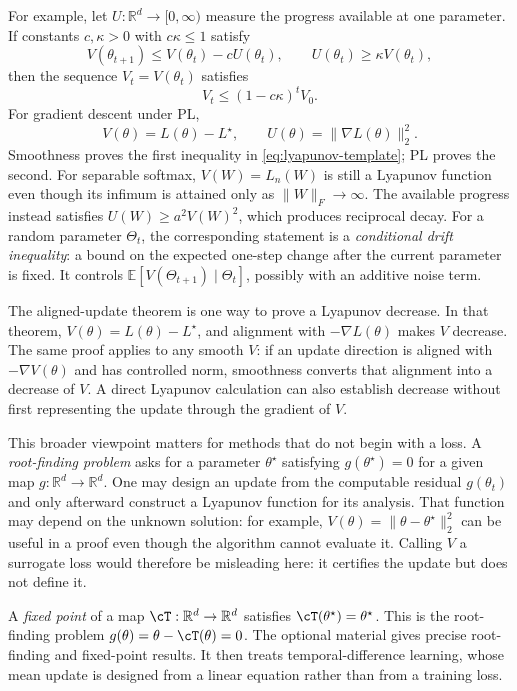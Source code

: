 \documentclass[11pt,twoside]{article}
\newcommand{\E}{\mathbb E}
\newcommand{\R}{\mathbb R}
\theoremstyle{definition}
\theoremstyle{remark}
\begin{document}
For example, let $U:\R^d\to[0,\infty)$ measure the progress available at one
parameter. If constants $c,\kappa>0$ with $c\kappa\le1$ satisfy
\begin{equation}
 V(\theta_{t+1})\le V(\theta_t)-cU(\theta_t),
 \qquad
 U(\theta_t)\ge\kappa V(\theta_t),
 \label{eq:lyapunov-template}
\end{equation}
then the sequence $V_t=V(\theta_t)$ satisfies
\begin{equation}
 V_t\le(1-c\kappa)^tV_0.
 \label{eq:lyapunov-geometric}
\end{equation}
For gradient descent under PL,
\[
 V(\theta)=L(\theta)-L^\star,
 \qquad U(\theta)=\|\nabla L(\theta)\|_2^2.
\]
Smoothness proves the first inequality in \cref{eq:lyapunov-template}; PL
proves the second. For separable softmax, $V(W)=L_n(W)$ is still a Lyapunov
function even though its infimum is attained only as $\|W\|_F\to\infty$. The
available progress instead satisfies $U(W)\ge a^2V(W)^2$, which produces
reciprocal decay. For a random parameter $\Theta_t$, the corresponding statement
is a \emph{conditional drift inequality}: a bound on the expected one-step
change after the current parameter is fixed. It controls
$\E[V(\Theta_{t+1})\mid\Theta_t]$, possibly with an additive noise term.

The aligned-update theorem is one way to prove a Lyapunov decrease. In that
theorem, $V(\theta)=L(\theta)-L^\star$, and alignment with
$-\nabla L(\theta)$ makes $V$ decrease. The same proof applies to any smooth
$V$: if an update direction is aligned with $-\nabla V(\theta)$ and has
controlled norm, smoothness converts that alignment into a decrease of $V$.
A direct Lyapunov calculation can also establish decrease without first
representing the update through the gradient of $V$.

This broader viewpoint matters for methods that do not begin with a loss. A
\emph{root-finding problem} asks for a parameter $\theta^\star$ satisfying
$g(\theta^\star)=0$ for a given map $g:\R^d\to\R^d$. One may design an update
from the computable residual $g(\theta_t)$ and only afterward construct a
Lyapunov function for its analysis. That function may depend on the unknown
solution: for example, $V(\theta)=\|\theta-\theta^\star\|_2^2$ can be useful in
a proof even though the algorithm cannot evaluate it. Calling $V$ a surrogate
loss would therefore be misleading here: it certifies the update but does not
define it.

A \emph{fixed point} of a map $\cT:\R^d\to\R^d$ satisfies
$\cT(\theta^\star)=\theta^\star$. This is the root-finding problem
$g(\theta)=\theta-\cT(\theta)=0$. The optional material gives precise
root-finding and fixed-point results. It then treats temporal-difference
learning, whose mean update is designed from a linear equation rather than
from a training loss.
\end{document}
